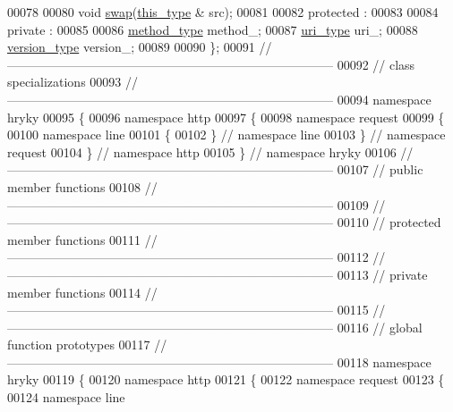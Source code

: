 \begin{DoxyCode}
00078 
00080     \textcolor{keywordtype}{void} \hyperlink{classhryky_1_1http_1_1request_1_1line_1_1_entity_a47591b333648718ec6bc317b07dbcddf}{swap}(\hyperlink{classhryky_1_1http_1_1request_1_1line_1_1_entity}{this_type} & src);
00081 
00082 \textcolor{keyword}{protected} :
00083 
00084 \textcolor{keyword}{private} :
00085 
00086     \hyperlink{classhryky_1_1http_1_1method_1_1_entity}{method_type} method\_;
00087     \hyperlink{classhryky_1_1uri_1_1_entity}{uri_type} uri\_;
00088     \hyperlink{classhryky_1_1http_1_1version_1_1_entity}{version_type} version\_;
00089 
00090 \};
00091 \textcolor{comment}{//
      ------------------------------------------------------------------------------}
00092 \textcolor{comment}{// class specializations}
00093 \textcolor{comment}{//
      ------------------------------------------------------------------------------}
00094 \textcolor{keyword}{namespace }hryky
00095 \{
00096 \textcolor{keyword}{namespace }http
00097 \{
00098 \textcolor{keyword}{namespace }request
00099 \{
00100 \textcolor{keyword}{namespace }line
00101 \{
00102 \} \textcolor{comment}{// namespace line}
00103 \} \textcolor{comment}{// namespace request}
00104 \} \textcolor{comment}{// namespace http}
00105 \} \textcolor{comment}{// namespace hryky}
00106 \textcolor{comment}{//
      ------------------------------------------------------------------------------}
00107 \textcolor{comment}{// public member functions}
00108 \textcolor{comment}{//
      ------------------------------------------------------------------------------}
00109 \textcolor{comment}{//
      ------------------------------------------------------------------------------}
00110 \textcolor{comment}{// protected member functions}
00111 \textcolor{comment}{//
      ------------------------------------------------------------------------------}
00112 \textcolor{comment}{//
      ------------------------------------------------------------------------------}
00113 \textcolor{comment}{// private member functions}
00114 \textcolor{comment}{//
      ------------------------------------------------------------------------------}
00115 \textcolor{comment}{//
      ------------------------------------------------------------------------------}
00116 \textcolor{comment}{// global function prototypes}
00117 \textcolor{comment}{//
      ------------------------------------------------------------------------------}
00118 \textcolor{keyword}{namespace }hryky
00119 \{
00120 \textcolor{keyword}{namespace }http
00121 \{
00122 \textcolor{keyword}{namespace }request
00123 \{
00124 \textcolor{keyword}{namespace }line

\end{DoxyCode}
